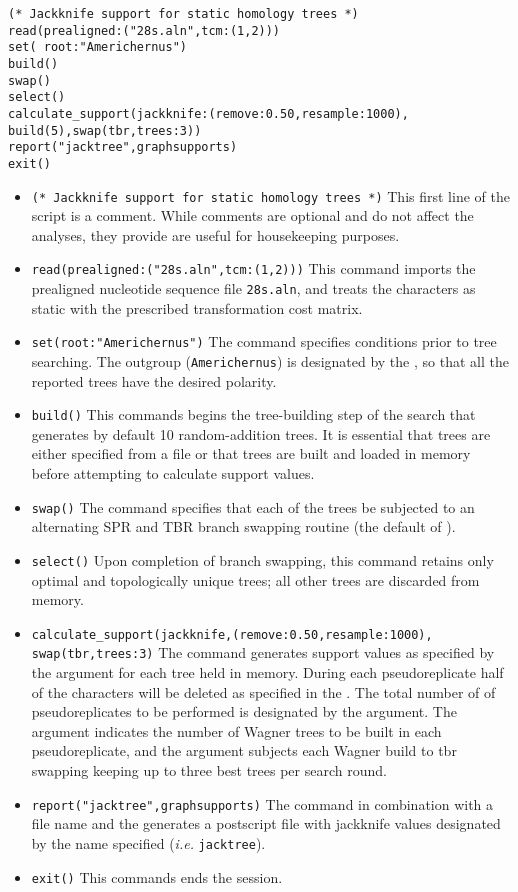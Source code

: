 \begin{verbatim}
(* Jackknife support for static homology trees *)
read(prealigned:("28s.aln",tcm:(1,2)))
set( root:"Americhernus")
build()
swap()
select()
calculate_support(jackknife:(remove:0.50,resample:1000), 
build(5),swap(tbr,trees:3))
report("jacktree",graphsupports)
exit()
\end{verbatim}

\begin{itemize}
\item \texttt{(* Jackknife support for static homology trees *)} This first line of the script is a comment. While comments are optional and do not affect the analyses, they provide are useful for housekeeping purposes.
\item \texttt{read(prealigned:("28s.aln",tcm:(1,2)))} This command imports the prealigned nucleotide sequence file \texttt{28s.aln}, and treats the characters as static with the prescribed transformation cost matrix.
\item \texttt{set(root:"Americhernus")} The  command specifies conditions prior to tree searching. The outgroup (\texttt{Americhernus}) is designated by the , so that all the reported trees have the desired polarity.     
\item \texttt{build()} This commands begins the tree-building step of the search that generates by default 10 random-addition trees. It is essential that trees are either specified from a file or that trees are built and loaded in memory before attempting to calculate support values.
\item \texttt{swap()} The  command specifies that each of the trees be subjected to an alternating SPR and TBR branch swapping routine (the default of \poy).
\item \texttt{select()} Upon completion of branch swapping, this command retains only optimal and topologically unique trees; all other trees are discarded from memory. 
\item \texttt{calculate\_support(jackknife,(remove:0.50,resample:1000),\\ swap(tbr,trees:3)} The  command generates support values as specified by the  argument for each tree held in memory. During each pseudoreplicate half of the characters will be deleted as specified in the .  The total number of of pseudoreplicates to be performed is designated by the  argument. The  argument indicates the number of Wagner trees to be built in each pseudoreplicate, and the  argument subjects each Wagner build to tbr swapping keeping up to three best trees per search round. 
\item \texttt{report("jacktree",graphsupports)}  The  command in combination with a file name and the  generates a postscript file with jackknife values designated by the name specified (\emph{i.e.} \texttt{jacktree}). 
\item \texttt{exit()} This commands ends the \poy session.
\end{itemize}

